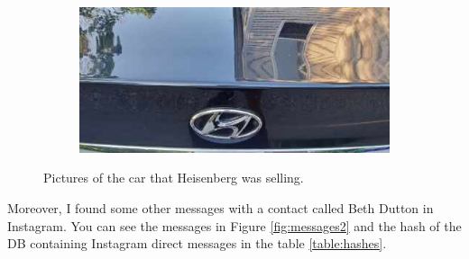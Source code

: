 \documentclass[12pt]{article}
\begin{document}
\begin{figure}[!ht]
\begin{subfigure}[b]{0.3\textwidth}
        \caption{}
    \end{subfigure} \\
    \vspace{3 pt}
    \begin{subfigure}[b]{0.6\textwidth}
        \centering
        \includegraphics[width=\textwidth]{images/car3.png}
        \caption{}
    \end{subfigure}
    \caption{Pictures of the car that Heisenberg was selling.}
    \label{fig:cars}
\end{figure}

Moreover, I found some other messages with a contact called Beth Dutton in Instagram. You can see the messages in Figure \ref{fig:messages2} and the hash of the DB containing Instagram direct messages in the table \ref{table:hashes}.
\end{document}
